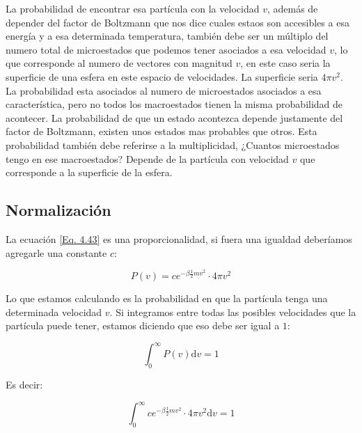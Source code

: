 \documentclass[11pt,fleqn]{book}
\begin{document}

La probabilidad de encontrar esa partícula con la velocidad $v$, además de depender del factor de Boltzmann que nos dice cuales estaos son accesibles a esa energía y a esa determinada temperatura, también debe ser un múltiplo del numero total de  microestados que podemos tener asociados a esa velocidad $v$, lo que corresponde al numero de vectores con magnitud $v$, en este caso seria la superficie de una esfera en este espacio de velocidades. La superficie seria $4\pi v^{2}$.\\

La probabilidad esta asociados al numero de microestados asociados a esa característica, pero no todos los macroestados tienen la misma probabilidad de acontecer. La probabilidad de que un estado acontezca depende justamente del factor de Boltzmann, existen unos estados mas probables que otros. Esta probabilidad también debe referirse a la multiplicidad, ¿Cuantos microestados tengo en ese macroestados? Depende de la partícula con velocidad $v$ que corresponde a la superficie de la esfera. 

\subsection{Normalización}

La ecuación \ref{Eq. 4.43} es una proporcionalidad, si fuera una igualdad deberíamos agregarle una constante $c$:

\begin{equation}
      P(v)=ce^{-\beta\frac{1}{2}mv^{2}}\cdot4\pi v^{2}
      \label{Eq. 4.44}
\end{equation}

Lo que estamos calculando es la probabilidad en que la partícula tenga una determinada velocidad $v$. Si integramos entre todas las posibles velocidades que la partícula puede tener, estamos diciendo que eso debe ser igual a $1$:

\begin{equation}
        \int_{0}^{\infty}P(v)\mathrm{d}v=1
    \label{Eq. 4.45}
\end{equation}

Es decir:

\begin{equation}
        \int_{0}^{\infty}ce^{-\beta\frac{1}{2}mv^{2}}\cdot4\pi v^{2}\mathrm{d}v=1
    \label{Eq. 4.46}
\end{equation}
\end{document}
